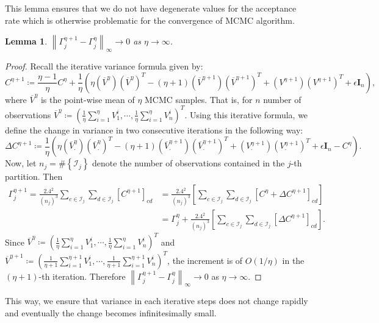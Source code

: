 \documentclass[
12pt]{article}
\newtheorem{lemma}{Lemma}[section]
\begin{document}
	This lemma ensures that we do not have degenerate values for the acceptance rate which is otherwise problematic for the convergence of MCMC algorithm.
	
	\begin{lemma}\label{lemm:stable:var}
		$\left\|\Gamma^{\eta+1}_{j} - \Gamma^{\eta}_{j}\right\|_{\infty}\to 0$ as $\eta\to\infty$.
	\end{lemma}
	
	\begin{proof}
		Recall the iterative variance formula given by:
		\begin{equation*}
			C^{\eta+1} \coloneqq 
			\frac{\eta-1}{\eta} C^{\eta} 
			+ \frac{1}{\eta}\left(\eta 
			\left(\overline{V}^{\eta}\right)\left(\overline{V}^{\eta}\right)^T 
			- (\eta+1)\left(\overline{V}^{\eta+1}\right)\left(\overline{V}^{\eta+1}\right)^T 
			+ \left({V}^{\eta+1}\right)\left({V}^{\eta+1}\right)^T + \epsilon\mathbf{I}_n\right),
		\end{equation*}
		where $\overline{V}^{\eta}$ is the point-wise mean of $\eta$ MCMC samples. That is, for $n$ number of observations $\overline{V}^{\eta} \coloneqq \left(\frac{1}{\eta}\sum_{i=1}^\eta V_1^i,\cdots, \frac{1}{\eta}\sum_{i=1}^\eta V_n^i\right)^T$. Using this iterative formula, we define the change in variance in two consecutive iterations in the following way:
		\begin{equation*}
			\Delta C^{\eta + 1} \coloneqq \frac{1}{\eta}\left(\eta \left(\overline{V}_{\cdot }^{\eta}\right)\left(\overline{V}_{\cdot }^{\eta}\right)^T 
			- (\eta+1)\left(\overline{V}_{\cdot }^{\eta+1}\right)\left(\overline{V}_{\cdot }^{\eta+1}\right)^T 
			+ \left({V}_{\cdot }^{\eta+1}\right)\left({V}_{\cdot }^{\eta+1}\right)^T + \epsilon\mathbf{I}_n - C^{\eta}\right).
		\end{equation*}
		Now, let $ n_j = \#\left\{\mathcal{I}_{j}\right\}$ denote the number of observations contained in the $j$-th partition. Then
		\begin{align*}
			\Gamma^{\eta+1}_j 
			= \frac{2.4^2}{\left(n_{j}\right)^3}
			\sum_{c\in\mathcal{I}_{j}}\sum_{d\in\mathcal{I}_{j}}\left[C^{\eta+1}\right]_{cd}
			&= \frac{2.4^2}{\left(n_{j}\right)^3}
			\left[\sum_{c\in\mathcal{I}_{j}}\sum_{d\in\mathcal{I}_{j}}\left[C^{\eta} + \Delta C^{\eta + 1}\right]_{cd}\right] \\
			&= \Gamma^{\eta}_j + \frac{2.4^2}{\left(n_{j}\right)^3} \left[\sum_{c\in\mathcal{I}_{j}}\sum_{d\in\mathcal{I}_{j}}\left[\Delta C^{\eta + 1}\right]_{cd}\right].
		\end{align*}
		Since $\overline{V}^{\eta} \coloneqq \left(\frac{1}{\eta}\sum_{i=1}^\eta V_1^i,\cdots, \frac{1}{\eta}\sum_{i=1}^\eta V_n^i\right)^T$ and $\overline{V}^{\eta+1} \coloneqq \left(\frac{1}{\eta+1}\sum_{i=1}^{\eta+1} V_1^i,\cdots, \frac{1}{\eta+1}\sum_{i=1}^{\eta+1} V_n^i\right)^T$, the increment is of $O(1/\eta)$ in the $(\eta +1)$-th iteration. Therefore $\left\|\Gamma^{\eta+1}_j - \Gamma^{\eta}_j\right\|_{\infty} \to 0$ as $\eta\to \infty$.
	\end{proof}
	This way, we ensure that variance in each iterative steps does not change rapidly and eventually the change becomes infinitesimally small.
	
\end{document}
